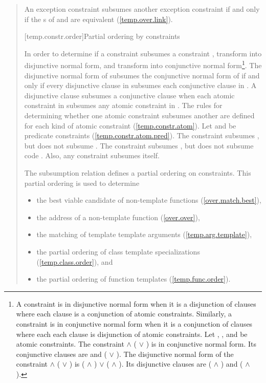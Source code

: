 \begin{quote}
\pnum
An exception constraint  subsumes another
exception constraint  if and only if the
s of 
and  are equivalent 
(\ref{temp.over.link}).



[temp.constr.order]{Partial ordering by constraints}

\pnum
In order to determine if a constraint  subsumes a constraint
, transform  into disjunctive normal form, 
and transform  into conjunctive normal form\footnote{
A constraint is in disjunctive normal form when it is a disjunction of
clauses where each clause is a conjunction of atomic constraints. 
% 
Similarly, a constraint is in conjunctive normal form when it is a conjunction 
of clauses where each each clause is disjunction of atomic constraints.
\enterexample
Let , , and  be atomic
constraints. 
% 
The constraint  $\land$ ( $\lor$ ) is in 
conjunctive normal form.
% 
Its conjunctive clauses are  and ( $\lor$ ).
% 
The disjunctive normal form of the constraint
 $\land$ ( $\lor$ ) 
is
( $\land$ ) $\lor$ ( $\land$ ).
% 
Its disjunctive clauses are ( $\land$ ) and 
( $\land$ ).
\exitexample
}.
% 
The disjunctive normal form of  subsumes the conjunctive normal 
form of  if and only if every disjunctive clause in  
subsumes each conjunctive clause in .
% 
A disjunctive clause  subsumes a conjunctive clause
 when each atomic constraint in  subsumes any atomic 
constraint in .
% 
The rules for determining whether one atomic constraint subsumes
another are defined for each kind of atomic constraint
(\ref{temp.constr.atom}).
% 
\enterexample
Let  and  be
predicate constraints (\ref{temp.constr.atom.pred}).
% 
The constraint  subsumes , 
but  does not subsume . 
% 
The constraint  subsumes , but
 does not subsume code . 
% 
Also, any constraint  subsumes itself.
\exitexample


\pnum
The subsumption relation defines a partial ordering on constraints. 
This partial ordering is used to determine
% 
\begin{itemize}
\item the best viable candidate of non-template functions
     (\ref{over.match.best}), 
\item the address of a non-template function
     (\ref{over.over}), 
\item the matching of template template arguments
     (\ref{temp.arg.template}), 
\item the partial ordering of class template specializations
     (\ref{temp.class.order}), and
\item the partial ordering of function templates
     (\ref{temp.func.order}).
\end{itemize}


\end{quote}
